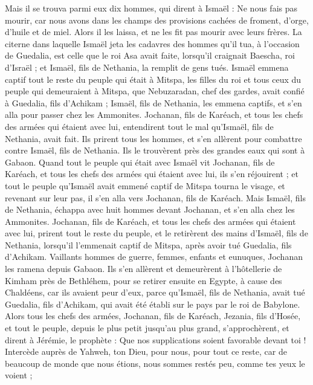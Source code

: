 \begin{multicols}{2}
Mais il se trouva parmi eux dix hommes, qui dirent à Ismaël : Ne nous fais pas mourir, car nous avons dans les champs des provisions cachées de froment, d'orge, d'huile et de miel. Alors il les laissa, et ne les fit pas mourir avec leurs frères.
La citerne dans laquelle Ismaël jeta les cadavres des hommes qu'il tua, à l'occasion de Guedalia, est celle que le roi Asa avait faite, lorsqu'il craignait Baescha, roi d'Israël ; et Ismaël, fils de Nethania, la remplit de gens tués.
Ismaël emmena captif tout le reste du peuple qui était à Mitspa, les filles du roi et tous ceux du peuple qui demeuraient à Mitspa, que Nebuzaradan, chef des gardes, avait confié à Guedalia, fils d'Achikam ; Ismaël, fils de Nethania, les emmena captifs, et s'en alla pour passer chez les Ammonites.
Jochanan, fils de Karéach, et tous les chefs des armées qui étaient avec lui, entendirent tout le mal qu'Ismaël, fils de Nethania, avait fait.
Ils prirent tous les hommes, et s'en allèrent pour combattre contre Ismaël, fils de Nethania. Ils le trouvèrent près des grandes eaux qui sont à Gabaon.
Quand tout le peuple qui était avec Ismaël vit Jochanan, fils de Karéach, et tous les chefs des armées qui étaient avec lui, ils s'en réjouirent ;
et tout le peuple qu'Ismaël avait emmené captif de Mitspa tourna le visage, et revenant sur leur pas, il s'en alla vers Jochanan, fils de Karéach.
Mais Ismaël, fils de Nethania, échappa avec huit hommes devant Jochanan, et s'en alla chez les Ammonites.
Jochanan, fils de Karéach, et tous les chefs des armées qui étaient avec lui, prirent tout le reste du peuple, et le retirèrent des mains d'Ismaël, fils de Nethania, lorsqu'il l'emmenait captif de Mitspa, après avoir tué Guedalia, fils d'Achikam. Vaillants hommes de guerre, femmes, enfants et eunuques, Jochanan les ramena depuis Gabaon.
Ils s'en allèrent et demeurèrent à l'hôtellerie de Kimham près de Bethléhem, pour se retirer ensuite en Egypte,
à cause des Chaldéens, car ils avaient peur d'eux, parce qu'Ismaël, fils de Nethania, avait tué Guedalia, fils d'Achikam, qui avait été établi sur le pays par le roi de Babylone.
\VerseOne{}Alors tous les chefs des armées, Jochanan, fils de Karéach, Jezania, fils d'Hosée, et tout le peuple, depuis le plus petit jusqu'au plus grand, s'approchèrent,
et dirent à Jérémie, le prophète : Que nos supplications soient favorable devant toi ! Intercède auprès de Yahweh, ton Dieu, pour nous, pour tout ce reste, car de beaucoup de monde que nous étions, nous sommes restés peu, comme tes yeux le voient ;

\end{multicols}
